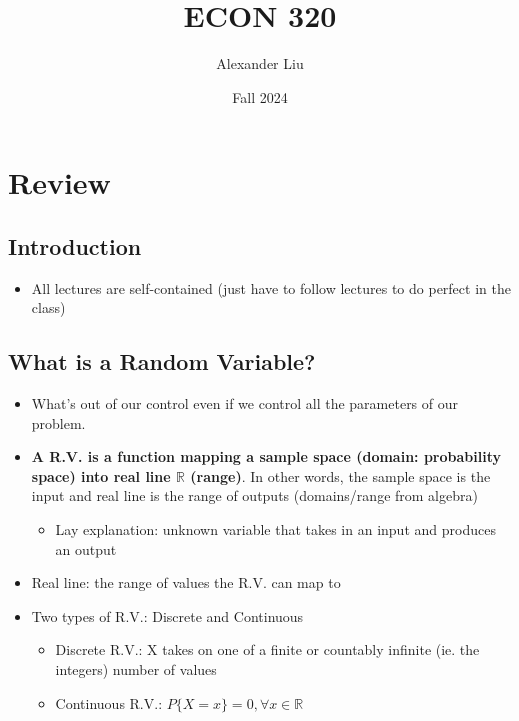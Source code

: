 \documentclass[10pt, oneside]{article}
\title{ECON 320}
\author{Alexander Liu}
\date{Fall 2024}
\newcommand{\R}{\mathbb{R}}
\begin{document}
\fontsize{12pt}{15pt}\selectfont

\maketitle
\tableofcontents

\vspace{.5in}

\section{Review}
\subsection{Introduction}
\begin{itemize}
    \item All lectures are self-contained (just have to follow lectures to do perfect in the class)
\end{itemize}
\subsection{What is a Random Variable?}
\begin{itemize}
    \item What's out of our control even if we control all the parameters of our problem.
    \item \textbf{A R.V. is a function mapping a sample space (domain: probability space) into real line $\R$ (range)}. In other words, the sample space is the input and real line is the range of outputs (domains/range from algebra)
    \begin{itemize}
        \item Lay explanation: unknown variable that takes in an input and produces an output
    \end{itemize}
    \item Real line: the range of values the R.V. can map to
    \item Two types of R.V.: Discrete and Continuous
    \begin{itemize}
         \item Discrete R.V.: X takes on one of a finite or countably infinite (ie. the integers) number of values
        \item Continuous R.V.: $P\{X=x\}=0, \forall x \in \R$
    \end{itemize}
\end{itemize}
\end{document}
